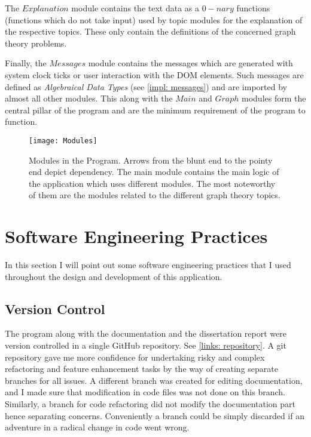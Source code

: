 The $Explanation$ module contains the text data as a $0-nary$ functions
(functions which do not take input) used by topic modules for the explanation of
the respective topics. These only contain the definitions of the concerned
graph theory problems.

Finally, the $Messages$ module contains the messages which are generated with system
clock ticks or user interaction with the DOM elements.  Such messages are
defined as \emph{Algebraical Data Types} (see \autoref{impl: messages}) and are
imported by almost all other modules. This along with the $Main$ and $Graph$
modules form the central pillar of the program and are the minimum requirement
of the program to function.

\begin{figure}[h]
\centering
\texttt{[image: Modules]}
\caption{
        Modules in the Program. Arrows from the blunt end to the pointy end
        depict dependency. The main module contains the main logic of the application which
        uses different modules.  The most noteworthy of them are the modules
        related to the different graph theory topics.
        }
\end{figure}

\section{Software Engineering Practices}
In this section I will point out some software engineering practices that I used throughout the design and development of this application.

\subsection{Version Control}
The program along with the documentation and the dissertation report were
version controlled in a single GitHub repository. See \autoref{links:
repository}. A git repository gave me more confidence for undertaking risky and complex
refactoring and feature enhancement tasks by the way of creating separate branches
for all issues. A different branch was created for editing
documentation, and I made sure that modification in code files was not
done on this branch. Similarly, a branch for code refactoring did not modify the
documentation part hence separating concerns. Conveniently a branch could be
simply discarded if an adventure in a radical change in code went wrong.

